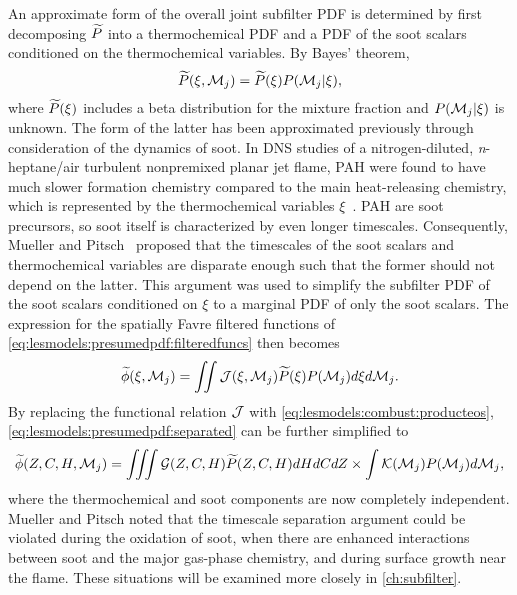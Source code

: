 An approximate form of the overall joint subfilter PDF is determined by first decomposing $\widetilde{P}$ into a thermochemical PDF and a PDF of the soot scalars conditioned on the thermochemical variables. By Bayes' theorem,
\begin{equation}\label{eq:lesmodels:presumedpdf:bayes}
  \widetilde{P}(\xi,\mathcal{M}_j) = \widetilde{P}(\xi)P(\mathcal{M}_j|\xi),
\end{equation}
where $\widetilde{P}(\xi)$ includes a beta distribution for the mixture fraction and $P(\mathcal{M}_j|\xi)$ is unknown. The form of the latter has been approximated previously through consideration of the dynamics of soot. In DNS studies of a nitrogen-diluted, \textit{n}-heptane/air turbulent nonpremixed planar jet flame, PAH were found to have much slower formation chemistry compared to the main heat-releasing chemistry, which is represented by the thermochemical variables $\xi$~\cite{attili2014,bisetti2012}. PAH are soot precursors, so soot itself is characterized by even longer timescales. Consequently, Mueller and Pitsch~\cite{subfilterpdf2011} proposed that the timescales of the soot scalars and thermochemical variables are disparate enough such that the former should not depend on the latter. This argument was used to simplify the subfilter PDF of the soot scalars conditioned on $\xi$ to a marginal PDF of only the soot scalars. The expression for the spatially Favre filtered functions of \cref{eq:lesmodels:presumedpdf:filteredfuncs} then becomes
\begin{equation}\label{eq:lesmodels:presumedpdf:separated}
  \widetilde{\phi}(\xi,\mathcal{M}_j) = \iint \mathcal{J}(\xi,\mathcal{M}_j)\widetilde{P}(\xi)P(\mathcal{M}_j) d\xi d\mathcal{M}_j.
\end{equation}
By replacing the functional relation $\mathcal{J}$ with \cref{eq:lesmodels:combust:producteos}, \cref{eq:lesmodels:presumedpdf:separated} can be further simplified to
\begin{equation}\label{eq:lesmodels:presumedpdf:indep}
  \widetilde{\phi}(Z,C,H,\mathcal{M}_j) = \iiint \mathcal{G}(Z,C,H)\widetilde{P}(Z,C,H) dHdCdZ \times \int \mathcal{K}(\mathcal{M}_j)P(\mathcal{M}_j) d\mathcal{M}_j,
\end{equation}
where the thermochemical and soot components are now completely independent. Mueller and Pitsch noted that the timescale separation argument could be violated during the oxidation of soot, when there are enhanced interactions between soot and the major gas-phase chemistry, and during surface growth near the flame. These situations will be examined more closely in \cref{ch:subfilter}.

